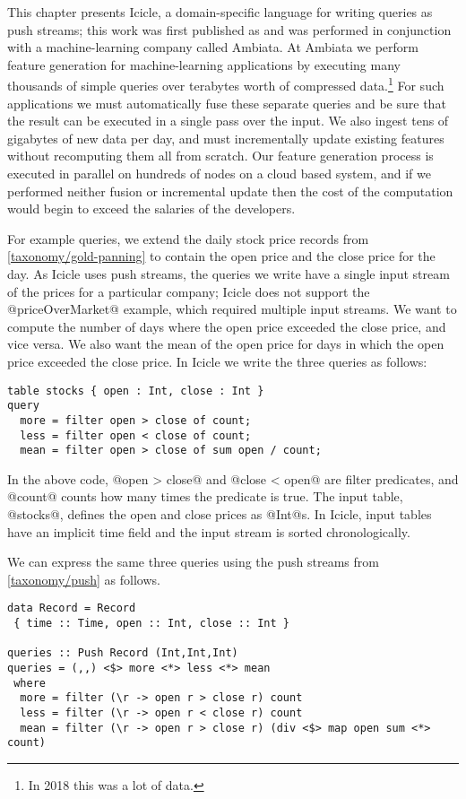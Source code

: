 \label{icicle:s:Introduction}

This chapter presents Icicle, a domain-specific language for writing queries as push streams; this work was first published as \citep{robinson2016icicle} and was performed in conjunction with a machine-learning company called Ambiata.
At Ambiata we perform feature generation for machine-learning applications by executing many thousands of simple queries over terabytes worth of compressed data.\footnote{In 2018 this was a lot of data.}
For such applications we must automatically fuse these separate queries and be sure that the result can be executed in a single pass over the input.
We also ingest tens of gigabytes of new data per day, and must incrementally update existing features without recomputing them all from scratch.
Our feature generation process is executed in parallel on hundreds of nodes on a cloud based system, and if we performed neither fusion or incremental update then the cost of the computation would begin to exceed the salaries of the developers.

For example queries, we extend the daily stock price records from \autoref{taxonomy/gold-panning} to contain the open price and the close price for the day.
As Icicle uses push streams, the queries we write have a single input stream of the prices for a particular company; Icicle does not support the @priceOverMarket@ example, which required multiple input streams.
We want to compute the number of days where the open price exceeded the close price, and vice versa.
We also want the mean of the open price for days in which the open price exceeded the close price.
In Icicle we write the three queries as follows:

\begin{lstlisting}
table stocks { open : Int, close : Int }
query 
  more = filter open > close of count;
  less = filter open < close of count;
  mean = filter open > close of sum open / count;
\end{lstlisting}


In the above code, @open > close@ and @close < open@ are filter predicates, and @count@ counts how many times the predicate is true.
The input table, @stocks@, defines the open and close prices as @Int@s.
In Icicle, input tables have an implicit time field and the input stream is sorted chronologically.

We can express the same three queries using the push streams from \autoref{taxonomy/push} as follows.

\begin{lstlisting}
data Record = Record
 { time :: Time, open :: Int, close :: Int }

queries :: Push Record (Int,Int,Int)
queries = (,,) <$> more <*> less <*> mean
 where
  more = filter (\r -> open r > close r) count
  less = filter (\r -> open r < close r) count
  mean = filter (\r -> open r > close r) (div <$> map open sum <*> count)
\end{lstlisting}

